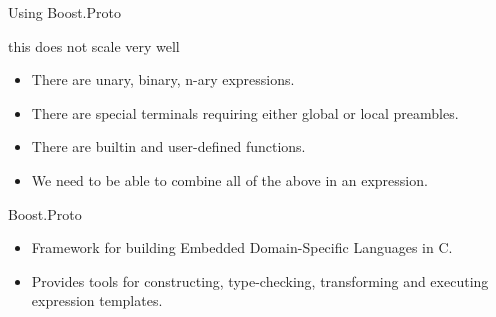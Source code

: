 \documentclass[@BEAMER_OPTIONS@]{beamer}
\newcommand{\CXX}{{\rm C}\plusplus}
\begin{document}
\begin{frame}{Using Boost.Proto}
    \begin{description}[\quad]
        \item[Problem:] this does not scale very well
            \begin{itemize}
                \item There are unary, binary, n-ary expressions.
                \item There are special terminals requiring either global or
                    local preambles.
                \item There are builtin and user-defined functions.
                \item We need to be able to combine all of the above in an
                    expression.
            \end{itemize}
            \vspace{\baselineskip}
        \item[Solution:] Boost.Proto
            \begin{itemize}
                \item Framework for building Embedded Domain-Specific
                    Languages in \CXX.
                \item Provides tools for constructing, type-checking,
                    transforming and executing expression templates.
            \end{itemize}
    \end{description}
\end{frame}
\end{document}
